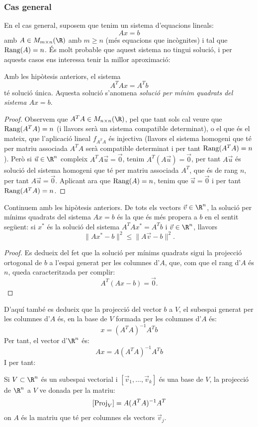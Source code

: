 \subsubsection{Cas general}
En el cas general, suposem que tenim un sistema d'equacions lineals:
\[
A x = b
\]
amb $A\in M_{m\times n}(\R)$ amb $m\geq n$ (més equacions que incògnites) i tal que $\operatorname{Rang}(A)=n$. És molt probable que aquest sistema no tingui solució, i per aquests casos ens interessa tenir la millor aproximació:
\begin{lema}
Amb les hipòtesis anteriors, el sistema
\[
A^T A x = A^T b
\]
té solució única. Aquesta solució s'anomena \emph{solució per mínim quadrats del sistema $Ax=b$}.
\end{lema}
\begin{proof}
Observem que $A^TA \in M_{n\times n}(\R)$, pel que tant sols cal veure que $\operatorname{Rang}(A^T A)=n$ (i llavors serà un sistema compatible determinat), o el que és el mateix, que l'aplicació lineal $f_{A^TA}$ és injectiva (llavors el sistema homogeni que té per matriu associada $A^TA$ serà compatible determinat i per tant $\operatorname{Rang}(A^T A)=n$). Però si $\vec u \in \R^n$ compleix $A^TA\vec u=\vec 0$, tenim $A^T(A\vec u)=\vec 0$, per tant $A\vec u$ és solució del sistema homogeni que té per matriu associada $A^T$, que és de rang $n$, per tant $A\vec u=\vec 0$. Aplicant ara que $\operatorname{Rang}(A)=n$, tenim que $\vec u=\vec 0$ i per tant $\operatorname{Rang}(A^TA)=n$.
\end{proof}
\begin{lema}
Continuem amb les hipòtesis anteriors.
De tots els vectors $\vec v \in \R^n$, la solució per mínims quadrats del sistema $Ax=b$ és la que és més propera a $b$ en el sentit següent: si $x^*$ és la solució del sistema $A^TAx^*=A^Tb$ i $\vec v\in \R^n$, llavors 
\[
\|Ax^* - b\|^2 \leq \|A\vec v- b\|^2.
\]
\end{lema}
\begin{proof}
Es dedueix del fet que la solució per mínims quadrats sigui la projecció ortogonal de $b$ a l'espai generat per les columnes d'$A$, que, com que el rang d'$A$ és $n$, queda caracteritzada per complir:
\[
A^T(Ax-b)=\vec 0 .
\]
\end{proof}
D'aquí també es dedueix que la projecció del vector $b$ a $V$, el subespai generat per les columnes d'$A$ és, en la base de $V$ formada per les columnes d'$A$ és:
\[
x=(A^TA)^{-1}A^Tb
\]
Per tant, el vector d'$\R^n$ és:
\[
Ax=A(A^TA)^{-1}A^Tb
\]
I per tant:
\begin{proposicio}
Si $V\subset \R^n$ és un subespai vectorial i $[\vec v_1, \dots , \vec v_k]$ és una base de $V$, la projecció de $\R^n$ a $V$ ve donada per la matriu:
\[
[\operatorname{Proj}_V]=A(A^TA)^{-1}A^T
\]
on $A$ és la matriu que té per columnes els vectors $\vec v_j$.
\end{proposicio}
